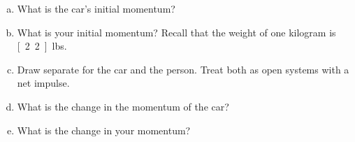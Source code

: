 \label{fnt7.1.1-4}


\begin{enumerate}[(a)]
	\item What is the car's initial momentum?
	\item What is your initial momentum? Recall that the weight of one kilogram is \unit[2.2]{lbs}.
	\item Draw separate \pcharts{} for the car and the person. Treat both as open systems with a net impulse.
	\item What is the change in the momentum of the car?
	\item What is the change in your momentum?
\end{enumerate}